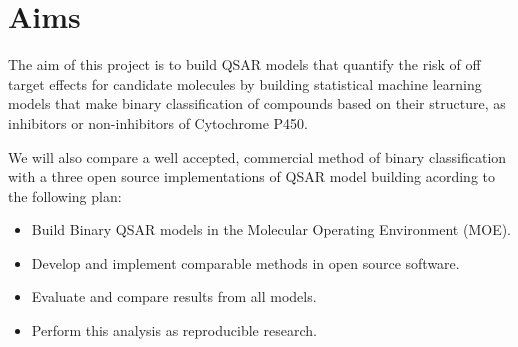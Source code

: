 \section{Aims}
The aim of this project is to build QSAR models that quantify the risk of off target effects for candidate molecules by building statistical machine learning models that make binary classification of compounds based on their structure, as inhibitors or non-inhibitors of Cytochrome P450.

We will also compare a well accepted, commercial method of binary classification with a three open source implementations of QSAR model building acording to the following plan:

\begin{itemize}

\item Build Binary QSAR models in the Molecular Operating Environment (MOE).

\item Develop and implement comparable methods in open source software.

\item Evaluate and compare results from all models.

\item Perform this analysis as reproducible research.

\end{itemize}

